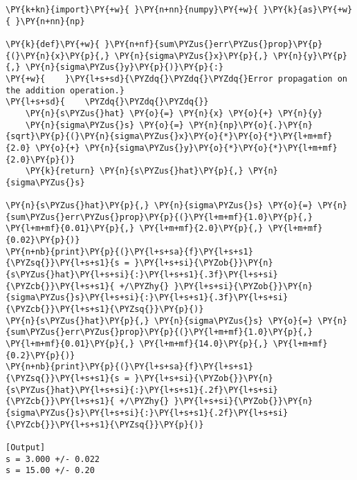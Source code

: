 \begin{Verbatim}[label=\makebox{\href{https://github.com/unipi-physics-labs/lab1-notes/tree/main/snippy/func_def.py}{https://github.com/.../func\_def.py}},commandchars=\\\{\}]
\PY{k+kn}{import}\PY{+w}{ }\PY{n+nn}{numpy}\PY{+w}{ }\PY{k}{as}\PY{+w}{ }\PY{n+nn}{np}

\PY{k}{def}\PY{+w}{ }\PY{n+nf}{sum\PYZus{}err\PYZus{}prop}\PY{p}{(}\PY{n}{x}\PY{p}{,} \PY{n}{sigma\PYZus{}x}\PY{p}{,} \PY{n}{y}\PY{p}{,} \PY{n}{sigma\PYZus{}y}\PY{p}{)}\PY{p}{:}
\PY{+w}{    }\PY{l+s+sd}{\PYZdq{}\PYZdq{}\PYZdq{}Error propagation on the addition operation.}
\PY{l+s+sd}{    \PYZdq{}\PYZdq{}\PYZdq{}}
    \PY{n}{s\PYZus{}hat} \PY{o}{=} \PY{n}{x} \PY{o}{+} \PY{n}{y}
    \PY{n}{sigma\PYZus{}s} \PY{o}{=} \PY{n}{np}\PY{o}{.}\PY{n}{sqrt}\PY{p}{(}\PY{n}{sigma\PYZus{}x}\PY{o}{*}\PY{o}{*}\PY{l+m+mf}{2.0} \PY{o}{+} \PY{n}{sigma\PYZus{}y}\PY{o}{*}\PY{o}{*}\PY{l+m+mf}{2.0}\PY{p}{)}
    \PY{k}{return} \PY{n}{s\PYZus{}hat}\PY{p}{,} \PY{n}{sigma\PYZus{}s}

\PY{n}{s\PYZus{}hat}\PY{p}{,} \PY{n}{sigma\PYZus{}s} \PY{o}{=} \PY{n}{sum\PYZus{}err\PYZus{}prop}\PY{p}{(}\PY{l+m+mf}{1.0}\PY{p}{,} \PY{l+m+mf}{0.01}\PY{p}{,} \PY{l+m+mf}{2.0}\PY{p}{,} \PY{l+m+mf}{0.02}\PY{p}{)}
\PY{n+nb}{print}\PY{p}{(}\PY{l+s+sa}{f}\PY{l+s+s1}{\PYZsq{}}\PY{l+s+s1}{s = }\PY{l+s+si}{\PYZob{}}\PY{n}{s\PYZus{}hat}\PY{l+s+si}{:}\PY{l+s+s1}{.3f}\PY{l+s+si}{\PYZcb{}}\PY{l+s+s1}{ +/\PYZhy{} }\PY{l+s+si}{\PYZob{}}\PY{n}{sigma\PYZus{}s}\PY{l+s+si}{:}\PY{l+s+s1}{.3f}\PY{l+s+si}{\PYZcb{}}\PY{l+s+s1}{\PYZsq{}}\PY{p}{)}
\PY{n}{s\PYZus{}hat}\PY{p}{,} \PY{n}{sigma\PYZus{}s} \PY{o}{=} \PY{n}{sum\PYZus{}err\PYZus{}prop}\PY{p}{(}\PY{l+m+mf}{1.0}\PY{p}{,} \PY{l+m+mf}{0.01}\PY{p}{,} \PY{l+m+mf}{14.0}\PY{p}{,} \PY{l+m+mf}{0.2}\PY{p}{)}
\PY{n+nb}{print}\PY{p}{(}\PY{l+s+sa}{f}\PY{l+s+s1}{\PYZsq{}}\PY{l+s+s1}{s = }\PY{l+s+si}{\PYZob{}}\PY{n}{s\PYZus{}hat}\PY{l+s+si}{:}\PY{l+s+s1}{.2f}\PY{l+s+si}{\PYZcb{}}\PY{l+s+s1}{ +/\PYZhy{} }\PY{l+s+si}{\PYZob{}}\PY{n}{sigma\PYZus{}s}\PY{l+s+si}{:}\PY{l+s+s1}{.2f}\PY{l+s+si}{\PYZcb{}}\PY{l+s+s1}{\PYZsq{}}\PY{p}{)}

[Output]
s = 3.000 +/- 0.022
s = 15.00 +/- 0.20
\end{Verbatim}
